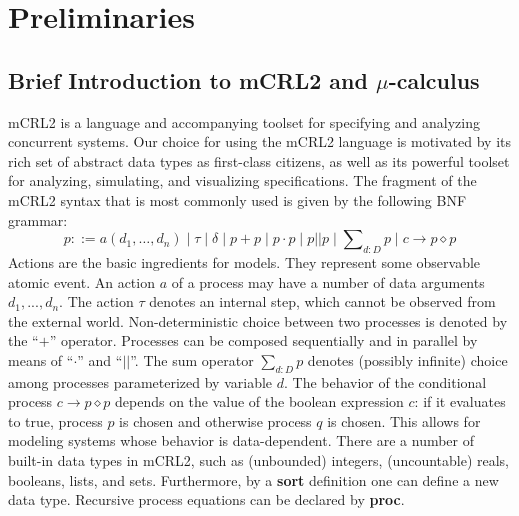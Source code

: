 \documentclass[letter]{llncs}
\begin{document}
\section{Preliminaries}
\label{sec:Preliminaries}
\vspace{-7 pt}

\subsection{Brief Introduction to mCRL2 and $\mu$-calculus}
mCRL2 is a language and accompanying toolset for specifying and analyzing concurrent systems. 
Our choice for using the mCRL2 language is motivated by its rich set of 
abstract data types as first-class citizens, as well as its powerful toolset for analyzing, simulating, and visualizing specifications. 
The fragment of the mCRL2 syntax that is most commonly used is given by the following BNF grammar:
\vspace{-7 pt}
\[p ::= a(d_1,\dots,d_n) \mid \tau \mid \delta \mid p+p \mid p\cdot p \mid p||p \mid \sum\nolimits_{d:D}p \mid c\rightarrow p\diamond p
\]
Actions are the basic ingredients for models. They represent some observable
atomic event. An action $a$ of a process may have a number of data arguments  \begin{math}d_1,...,d_n\end{math}.
The action ${\tau}$ denotes an internal step, which cannot be observed from the external world. 
Non-deterministic choice between two processes
is denoted by the ``$+$'' operator. Processes can be composed sequentially and in parallel by means of ``$\cdot$'' and
``${||}$''. The sum
operator $\sum_{d:D}p$ denotes (possibly infinite) choice among
processes parameterized by variable $d$. The behavior of the conditional process $c\rightarrow p\diamond p$ 
depends on the value of the boolean expression $c$: if it evaluates to true, process $p$
is chosen and otherwise process $q$ is chosen.
This allows for modeling systems whose behavior is data-dependent.
There are a number of built-in data types in mCRL2, such as (unbounded) integers, (uncountable)
reals, booleans, lists, and sets. 
Furthermore, by a \textbf{sort} definition one can define a new data type. Recursive process 
equations can be declared by \textbf{proc}.
\end{document}
